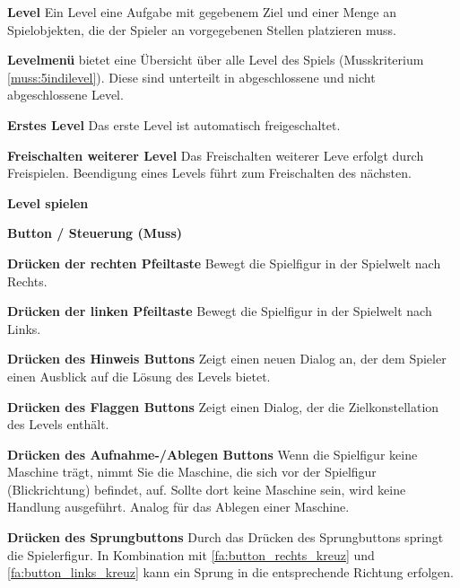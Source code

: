 \documentclass{scrartcl}
\begin{document}
\begin{falist}[resume]
	\item \label{fa:level} \textbf{Level} Ein Level eine Aufgabe mit gegebenem Ziel und einer Menge an Spielobjekten, die der Spieler an vorgegebenen Stellen platzieren muss.
	\item \label{fa:levelmenue} \textbf{Levelmenü} bietet eine Übersicht über alle Level des Spiels (Musskriterium \ref{muss:5indilevel}). Diese sind unterteilt in abgeschlossene und nicht abgeschlossene Level.
    \begin{falist}
        \item \textbf{Erstes Level} Das erste Level ist automatisch freigeschaltet.
        \item \textbf{Freischalten weiterer Level} Das Freischalten weiterer Leve erfolgt durch Freispielen. Beendigung eines Levels führt zum Freischalten des nächsten.
    \end{falist}
    \item \label{fa:spielen} \textbf{Level spielen}
    \item \label{fa:buttons_muss} \textbf{Button / Steuerung (Muss)}
    \begin{falist}
    	\item \label{fa:button_rechts_kreuz} \textbf{Drücken der rechten Pfeiltaste} Bewegt die Spielfigur in der Spielwelt nach Rechts.
    	\item \label{fa:button_links_kreuz} \textbf{Drücken der linken Pfeiltaste} Bewegt die Spielfigur in der Spielwelt nach Links.
    	\item \label{fa:button_lampe} \textbf{Drücken des Hinweis Buttons} Zeigt einen neuen Dialog an, der dem Spieler einen Ausblick auf die Lösung des Levels bietet.
    	\item \label{fa:button_flagge} \textbf{Drücken des Flaggen Buttons} Zeigt einen Dialog, der die Zielkonstellation des Levels enthält.
    	\item \label{fa:button_aufnehmen_ablegen} \textbf{Drücken des Aufnahme-/Ablegen Buttons} Wenn die Spielfigur keine Maschine trägt, nimmt Sie die Maschine, die sich vor der Spielfigur (Blickrichtung) befindet, auf. Sollte dort keine Maschine sein, wird keine Handlung ausgeführt. Analog für das Ablegen einer Maschine.
    	\item \label{fa:button_jump} \textbf{Drücken des Sprungbuttons} Durch das Drücken des Sprungbuttons springt die Spielerfigur. In Kombination mit \ref{fa:button_rechts_kreuz} und \ref{fa:button_links_kreuz} kann ein Sprung in die entsprechende Richtung erfolgen.

\end{falist}
\end{falist}
\end{document}
